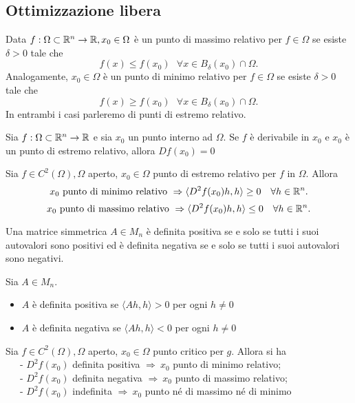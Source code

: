 \documentclass[12px]{article}
\begin{document}
	\subsection{Ottimizzazione libera}
	\begin{defi}
		Data $f:\Omega\subset \mathbb{R}^n \rightarrow\mathbb{R}, x_0\in\Omega$ è un punto di massimo relativo per $f\in\Omega$ se esiste $\delta>0$ tale che 
		\[
		f(x)\leq f(x_0) \ \ \ \forall x\in B_\delta(x_0)\cap\Omega
		.\] 
		Analogamente, $x_0\in\Omega$ è un punto di minimo relativo per $f\in\Omega$ se esiste $\delta>0$ tale che
		\[
		f(x)\geq f(x_0) \ \ \ \forall x\in B_\delta(x_0)\cap\Omega
		.\] 
		In entrambi i casi parleremo di punti di estremo relativo.
	\end{defi}
	\begin{teo}[Fermat in $\R^n$]
		Sia $f:\Omega\subset\mathbb{R}^n \rightarrow\mathbb{R}$ e sia $x_0$ un punto interno ad $\Omega$. Se $f$ è derivabile in $x_0$ e $x_0$ è un punto di estremo relativo, allora $Df(x_0) = 0$
	\end{teo}
	\begin{prop}
		Sia $f\in C^2(\Omega), \Omega$ aperto, $x_0\in\Omega$ punto di estremo relativo per $f$ in $\Omega$. Allora
		 \[
			 x_0 \text{ punto di minimo relativo } \Rightarrow \langle D^2f(x_0)h, h \rangle \geq 0 \ \ \ \forall h\in \mathbb{R}^n
		.\] 
		 \[
			 x_0 \text{ punto di massimo relativo } \Rightarrow \langle D^2f(x_0)h, h \rangle \leq 0 \ \ \ \forall h\in \R^n
		.\] 
	\end{prop}
	\begin{teo}
		Una matrice simmetrica $A\in M_n$ è definita positiva se e solo se tutti i suoi autovalori sono positivi ed è definita negativa se e solo se tutti i suoi autovalori sono negativi.
	\end{teo}
	\begin{defi}
		Sia $A\in M_n$.
		\begin{itemize}
			\item $A$ è definita positiva se $ \langle Ah, h \rangle > 0$ per ogni $h\neq 0$
			\item $A$ è definita negativa se $ \langle Ah, h \rangle < 0$ per ogni $h\neq 0$
		\end{itemize}
	\end{defi}
	\newpage
	\begin{teo}
		Sia $f\in C^2(\Omega),\Omega$ aperto, $x_0\in\Omega$ punto critico per  $g$. Allora si ha\\
		\text{} \ \ \ - $D^2f(x_0)$ definita positiva $ \Rightarrow \ x_0$ punto di minimo relativo;\\
		\text{} \ \ \ - $D^2f(x_0)$ definita negativa $ \Rightarrow \ x_0$ punto di massimo relativo;\\
		\text{} \ \ \ - $D^2f(x_0)$ indefinita $ \Rightarrow \ x_0$ punto né di massimo né di minimo\\

	\end{teo}
\end{document}
